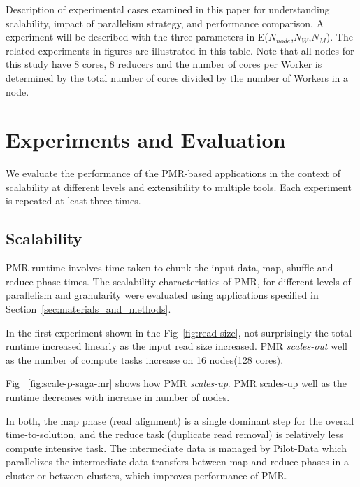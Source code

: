 \documentclass{acm_proc_article-sp}
\begin{document}
\begin{center}
\begin{table}[ht]
 \caption{Description of experimental cases examined in this paper for understanding scalability, impact of parallelism strategy, and performance comparison.  A experiment will be described with the three parameters in E($N_{node}$,$N_W$,$N_M$).  The related experiments in figures are illustrated in this table.  Note that all nodes for this study have 8 cores, 8 reducers and the number of cores per Worker is determined by the total number of cores divided by the number of Workers in a node.}
    \label{table:exp-description} 
\end{table}
\end{center}

\section{Experiments and Evaluation}\label{sec:results}

We evaluate the performance of the PMR-based applications in the
context of scalability at different levels and extensibility to
multiple tools.  Each experiment is repeated at least three times.

\subsection{Scalability}

PMR runtime involves time taken to chunk the input data, map, shuffle
and reduce phase times.  The scalability characteristics of PMR, for
different levels of parallelism and granularity were evaluated using
applications specified in Section~\ref{sec:materials_and_methods}.  

In the first experiment shown in the Fig~\ref{fig:read-size}, not
surprisingly the total runtime increased linearly as the input read
size increased. PMR \textit{scales-out} well as the number of compute tasks increase on 16 nodes(128 cores).

Fig ~\ref{fig:scale-p-saga-mr} shows how PMR \textit{scales-up}. PMR
scales-up well as the runtime decreases with increase in number of
nodes.

In both, the map phase (read alignment) is a single dominant step for
the overall time-to-solution, and the reduce task (duplicate read
removal) is relatively less compute intensive task. The intermediate
data is managed by Pilot-Data which parallelizes the intermediate data
transfers between map and reduce phases in a cluster or between
clusters, which improves performance of PMR.
\end{document}
